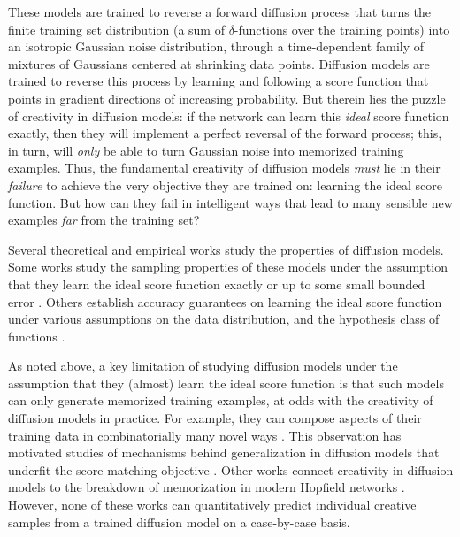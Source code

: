 \documentclass{article}
\theoremstyle{plain}
\theoremstyle{definition}
\theoremstyle{remark}
\begin{document}
These models are trained to reverse a forward diffusion process that turns the finite training set distribution (a sum of $\delta$-functions over the training points) into an isotropic Gaussian noise distribution, through a time-dependent family of mixtures of Gaussians centered at shrinking data points. Diffusion models are trained to reverse this process by learning and following a score function that points in gradient directions of increasing probability. But therein lies the puzzle of creativity in diffusion models:  if the network can learn this {\it ideal} score function exactly, then they will implement a perfect reversal of the forward process; this, in turn, will {\it only} be able to turn Gaussian noise into memorized training examples.  Thus, the fundamental creativity of diffusion models {\it must} lie in their {\it failure} to achieve the very objective they are trained on: learning the ideal score function.  But how can they fail in intelligent ways that lead to many sensible new examples {\it far} from the training set?    

Several theoretical and empirical works study the properties of diffusion models. Some works study the sampling properties of these models under the assumption that they learn the ideal score function exactly \cite{biroli2024dynamical, de2022convergence} or up to some small bounded error \cite{benton2024nearly}. Others establish accuracy guarantees on learning the ideal score function under various assumptions on the data distribution, and the hypothesis class of functions \cite{lee2022convergence,chen2023score,oko2023diffusion,ventura2024manifolds,Cui2023-mr,Cui2023-am}.

As noted above, a key limitation of studying diffusion models under the assumption that they (almost) learn the ideal score function is that such models can only generate memorized training examples, at odds with the creativity of diffusion models in practice. For example, they can compose aspects of their training data in combinatorially many novel ways \cite{sclocchi2024phase,okawa2024compositional}. This observation has motivated studies of mechanisms behind generalization in diffusion models that underfit the score-matching objective \cite{kadkhodaie2023generalization,zhang2023emergence,wang2024diffusion}. Other works connect creativity in diffusion models to the breakdown of memorization in modern Hopfield networks \cite{ambrogioni2023search,hoover2023memory,pham2024memorization}. However, none of these works can quantitatively predict individual creative samples from a trained diffusion model on a case-by-case basis. 
\end{document}
